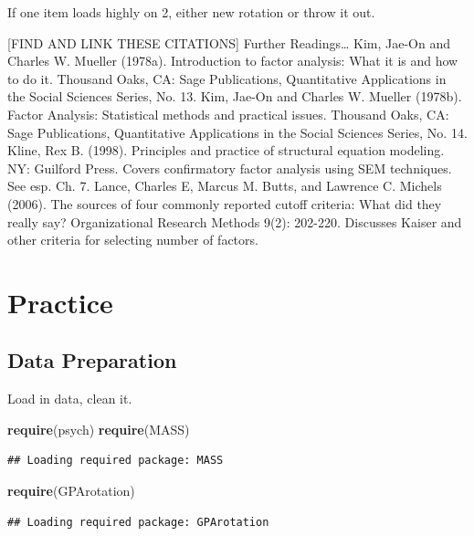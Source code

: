 \documentclass[]{book}
\newenvironment{Shaded}{\begin{snugshade}}{\end{snugshade}}
\newcommand{\KeywordTok}[1]{\textcolor[rgb]{0.13,0.29,0.53}{\textbf{#1}}}
\newcommand{\NormalTok}[1]{#1}
\theoremstyle{definition}
\theoremstyle{definition}
\theoremstyle{definition}
\theoremstyle{remark}
\begin{document}
If one item loads highly on 2, either new rotation or throw it out.

{[}FIND AND LINK THESE CITATIONS{]} Further Readings\ldots{} Kim, Jae-On
and Charles W. Mueller (1978a). Introduction to factor analysis: What it
is and how to do it. Thousand Oaks, CA: Sage Publications, Quantitative
Applications in the Social Sciences Series, No. 13. Kim, Jae-On and
Charles W. Mueller (1978b). Factor Analysis: Statistical methods and
practical issues. Thousand Oaks, CA: Sage Publications, Quantitative
Applications in the Social Sciences Series, No. 14. Kline, Rex B.
(1998). Principles and practice of structural equation modeling. NY:
Guilford Press. Covers confirmatory factor analysis using SEM
techniques. See esp. Ch. 7. Lance, Charles E, Marcus M. Butts, and
Lawrence C. Michels (2006). The sources of four commonly reported cutoff
criteria: What did they really say? Organizational Research Methods
9(2): 202-220. Discusses Kaiser and other criteria for selecting number
of factors.

\section{Practice}\label{practice-4}

\subsection{Data Preparation}\label{data-preparation}

Load in data, clean it.

\begin{Shaded}
\begin{Highlighting}[]
\KeywordTok{require}\NormalTok{(psych)}
\KeywordTok{require}\NormalTok{(MASS)}
\end{Highlighting}
\end{Shaded}

\begin{verbatim}
## Loading required package: MASS
\end{verbatim}

\begin{Shaded}
\begin{Highlighting}[]
\KeywordTok{require}\NormalTok{(GPArotation)}
\end{Highlighting}
\end{Shaded}

\begin{verbatim}
## Loading required package: GPArotation
\end{verbatim}
\end{document}
